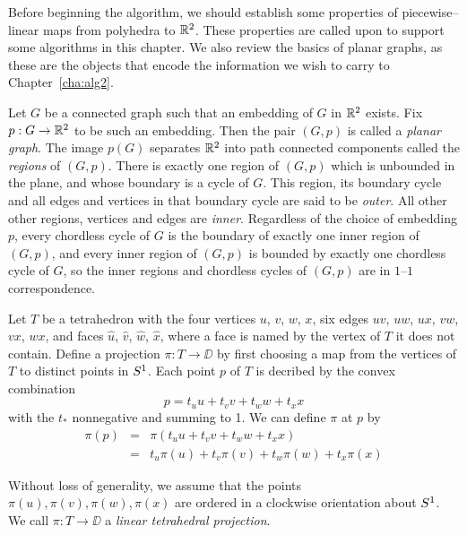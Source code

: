 \label{alg:proj}
Before beginning the algorithm, we should establish some properties of piecewise--linear maps from polyhedra to $\mathbb{R}^2$.
These properties are called upon to support some algorithms in this chapter.
We also review the basics of planar graphs, as these are the objects that encode the information we wish to carry to Chapter~\ref{cha:alg2}.

\begin{defn}
Let $G$ be a connected graph such that an embedding of $G$ in $\mathbb{R}^2$ exists.
Fix $p:G\to\mathbb{R}^2$ to be such an embedding.
Then the pair $(G,p)$ is called a \emph{planar graph}.
The image $p(G)$ separates $\mathbb{R}^2$ into path connected components called the \emph{regions} of $(G,p)$.
There is exactly one region of $(G,p)$ which is unbounded in the plane, and whose boundary is a cycle of $G$.
This region, its boundary cycle and all edges and vertices in that boundary cycle are said to be \emph{outer}.
All other other regions, vertices and edges are \emph{inner}.
Regardless of the choice of embedding $p$, every chordless cycle of $G$ is the boundary of exactly one inner region of $(G,p)$, and every inner region of $(G,p)$ is bounded by exactly one chordless cycle of $G$, so the inner regions and chordless cycles of $(G,p)$ are in $1$--$1$ correspondence.
\end{defn}

\begin{defn}
\label{def:stdproj}
Let $T$ be a tetrahedron with the four vertices $u$, $v$, $w$, $x$, six edges $uv$, $uw$, $ux$, $vw$, $vx$, $wx$, and faces $\hat{u}$, $\hat{v}$, $\hat{w}$, $\hat{x}$, where a face is named by the vertex of $T$ it does not contain.
Define a projection $\pi: T \to\DD$ by first choosing a map from the vertices of $T$ to distinct points in $S^1$.
Each point $p$ of $T$ is decribed by the convex combination
\[
  p = t_u u + t_v v + t_w w + t_x x
\]
with the $t_*$ nonnegative and summing to 1.
We can define $\pi$ at $p$ by
\begin{eqnarray}
\label{affine_extension}
  \pi(p)
  &=&
  \pi(t_u u + t_v v + t_w w + t_x x) \nonumber \\
  &=&
  t_u \pi(u) + t_v \pi(v) + t_w \pi(w) + t_x \pi(x)
\end{eqnarray}
  
Without loss of generality, we assume that the points $\pi(u),\pi(v),\pi(w),\pi(x)$ are ordered in a clockwise orientation about $S^1$.
We call $\pi:T\to\DD$ a \emph{linear tetrahedral projection}.
\end{defn}

